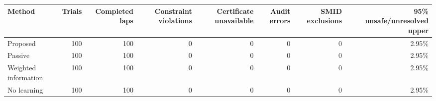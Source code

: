 \begin{tabular}{lrrrrrrr}
\toprule
Method & Trials & Completed laps & Constraint violations & Certificate unavailable & Audit errors & SMID exclusions & 95\% unsafe/unresolved upper \\
\midrule
Proposed & 100 & 100 & 0 & 0 & 0 & 0 & 2.95\% \\
Passive & 100 & 100 & 0 & 0 & 0 & 0 & 2.95\% \\
Weighted information & 100 & 100 & 0 & 0 & 0 & 0 & 2.95\% \\
No learning & 100 & 100 & 0 & 0 & 0 & 0 & 2.95\% \\
\bottomrule
\end{tabular}
